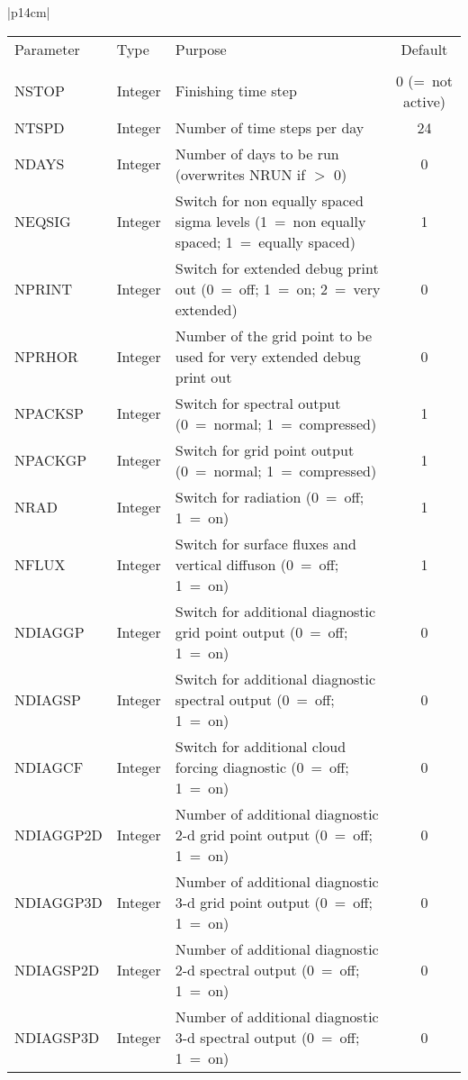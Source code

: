 \begin{center}
\begin{tabular}{|p{14cm}|}
\begin{center}
\begin{tabular}{l l p{5cm} c} %
Parameter & Type & Purpose & Default \\
&&&\\
NSTOP & Integer & Finishing time step & 0 (=~not active) \\
NTSPD & Integer & Number of time steps per day & 24 \\
NDAYS & Integer & Number of days to be run (overwrites NRUN if  $>$ 0) & 0 \\
NEQSIG & Integer & Switch for non equally spaced sigma levels (1~=~non equally spaced;
1~=~equally spaced) & 1 \\
NPRINT & Integer & Switch for extended debug print out (0~=~off; 1~=~on; 2~=~very
extended) & 0\\
NPRHOR & Integer & Number of the grid point to be used for very extended debug print out
&
0 \\
NPACKSP & Integer & Switch for spectral output (0~=~normal; 1~=~compressed) & 1 \\
NPACKGP & Integer & Switch for grid point output (0~=~normal; 1~=~compressed) & 1 \\
NRAD & Integer & Switch for radiation (0~=~off; 1~=~on) & 1 \\
NFLUX & Integer & Switch for surface fluxes and vertical diffuson (0~=~off; 1~=~on) & 1
\\
NDIAGGP & Integer & Switch for additional diagnostic grid point output (0~=~off; 1~=~on)
& 0\\
NDIAGSP & Integer & Switch for additional diagnostic spectral output (0~=~off; 1~=~on) &
0 \\
NDIAGCF & Integer & Switch for additional cloud forcing diagnostic (0~=~off; 1~=~on) &
0
\\
NDIAGGP2D & Integer & Number of  additional diagnostic 2-d grid point output (0~=~off;
1~=~on) & 0 \\
NDIAGGP3D & Integer & Number of  additional diagnostic 3-d grid point output (0~=~off;
1~=~on) & 0 \\
NDIAGSP2D & Integer & Number of  additional diagnostic 2-d spectral output (0~=~off;
1~=~on) & 0 \\
NDIAGSP3D & Integer & Number of  additional diagnostic 3-d spectral output (0~=~off;
1~=~on) & 0 \\
\end{tabular}
\end{center}
\end{tabular}
\end{center}

